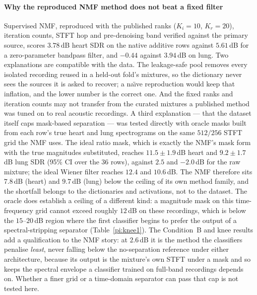 \documentclass[conference]{IEEEtran}
\begin{document}
\paragraph{Why the reproduced NMF method does not beat a fixed filter}
Supervised NMF, reproduced with the published ranks ($K_i{=}10$, $K_r{=}20$), iteration counts, STFT hop and pre-denoising band verified against the primary source, scores $3.78$\,dB heart SDR on the native additive rows against $5.61$\,dB for a zero-parameter bandpass filter, and $-0.44$ against $3.94$\,dB on lung. Two explanations are compatible with the data. The leakage-safe pool removes every isolated recording reused in a held-out fold's mixtures, so the dictionary never sees the sources it is asked to recover; a na\"{\i}ve reproduction would keep that inflation, and the lower number is the correct one. And the fixed ranks and iteration counts may not transfer from the curated mixtures a published method was tuned on to real acoustic recordings. A third explanation --- that the dataset itself caps mask-based separation --- was tested directly with oracle masks built from each row's true heart and lung spectrograms on the same $512/256$ STFT grid the NMF uses. The ideal ratio mask, which is exactly the NMF's mask form with the true magnitudes substituted, reaches $11.5 \pm 1.9$\,dB heart and $9.2 \pm 1.7$\,dB lung SDR (95\% CI over the 36 rows), against $2.5$ and $-2.0$\,dB for the raw mixture; the ideal Wiener filter reaches $12.4$ and $10.6$\,dB. The NMF therefore sits $7.8$\,dB (heart) and $9.7$\,dB (lung) below the ceiling of its own method family, and the shortfall belongs to the dictionaries and activations, not to the dataset. The oracle does establish a ceiling of a different kind: a magnitude mask on this time-frequency grid cannot exceed roughly $12$\,dB on these recordings, which is below the $15$--$20$\,dB region where the first classifier begins to prefer the output of a spectral-stripping separator (Table~\ref{pi:knee1}). The Condition~B and knee results add a qualification to the NMF story: at $2.6$\,dB it is the method the classifiers penalise \emph{least}, never falling below the no-separation reference under either architecture, because its output is the mixture's own STFT under a mask and so keeps the spectral envelope a classifier trained on full-band recordings depends on. Whether a finer grid or a time-domain separator can pass that cap is not tested here.

\end{document}
